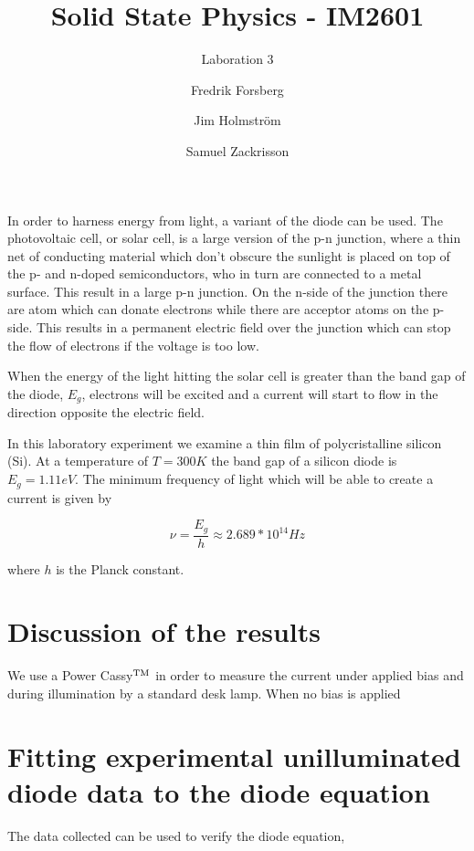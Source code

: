 \documentclass[a4paper,twoside=false,abstract=false,numbers=noenddot,
titlepage=false,headings=small,parskip=half,version=last]{scrartcl}
\title{Solid State Physics - IM2601}
\subtitle{Laboration 3}
\author[1]{Fredrik Forsberg}
\author[1]{Jim Holmström}
\author[1]{Samuel Zackrisson}
\affil[1]{Engineering Physics, Royal Institute of Technology}
\affil[1]{\{fforsber, jimho, samuelz\}@kth.se}
\begin{document}
\maketitle
\thispagestyle{empty}


In order to harness energy from light, a variant of the diode can be used. The
photovoltaic cell, or solar cell, is a large version of the p-n junction, where a thin net of conducting material
which don't obscure the sunlight is placed on top of the p- and n-doped semiconductors,
who in turn are connected to a metal surface. This result in a large p-n junction.
On the n-side of the junction there are atom which can donate electrons while there are acceptor
atoms on the p-side.
This results in a permanent electric field over the junction which can stop the flow of electrons if the voltage is too low.

When the energy of the light hitting the solar cell is greater than the band gap of the diode, $E_g$, electrons will be excited and a current will start to flow in the direction opposite the electric field.

In this laboratory experiment we examine a thin film of polycristalline silicon (Si). At a temperature of $T = 300 K$ the band gap of a silicon diode is $E_g=1.11 eV$. The minimum frequency of light which will be able to create a current is given by

\begin{equation}
    \nu = \frac{E_g}{h} \approx 2.689*10^{14} Hz
\end{equation}

where $h$ is the Planck constant.

\section{Discussion of the results}

We use a Power Cassy$\textsuperscript{TM}$ in order to measure the current under applied bias and during illumination by a standard desk lamp.
When no bias is applied



\section{Fitting experimental unilluminated diode data to the diode equation}
The data collected can be used to verify the diode equation,
\end{document}
